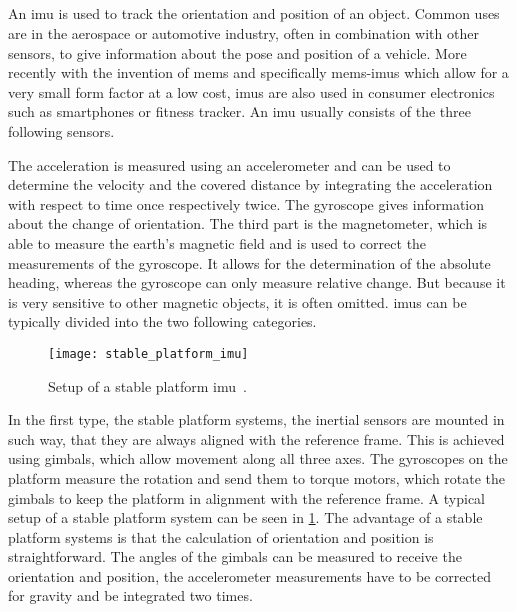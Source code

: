 \subsection{}
An \gls{imu} is used to track the orientation and position of an object.
Common uses are in the aerospace or automotive industry, often in combination with other sensors, to give information about the pose and position of a vehicle.
More recently with the invention of \gls{mems} and specifically \gls{mems}-\glspl{imu} which allow for a very small form factor at a low cost, \glspl{imu} are also used in consumer electronics such as smartphones or fitness tracker.
An \gls{imu} usually consists of the three following sensors.\par
The acceleration is measured using an accelerometer and can be used to determine the velocity and the covered distance by integrating the acceleration with respect to time once respectively twice.
The gyroscope gives information about the change of orientation.
The third part is the magnetometer, which is able to measure the earth's magnetic field and is used to correct the measurements of the gyroscope.
It allows for the determination of the absolute heading, whereas the gyroscope can only measure relative change. But because it is very sensitive to other magnetic objects, it is often omitted.
\glspl{imu} can be typically divided into the two following categories.\par
\begin{figure}[h]
    \centering
    \texttt{[image: stable\_platform\_imu]}
    \caption[Setup of a stable platform \acrshort{imu}]{Setup of a stable platform \acrshort{imu}~\cite{Woodman2007}.}
    \label{fig:stable_platform_imu}
\end{figure}
In the first type, the stable platform systems, the inertial sensors are mounted in such way, that they are always aligned with the reference frame.
This is achieved using gimbals, which allow movement along all three axes.
The gyroscopes on the platform measure the rotation and send them to torque motors, which rotate the gimbals to keep the platform in alignment with the reference frame.
A typical setup of a stable platform system can be seen in \cref{fig:stable_platform_imu}.
The advantage of a stable platform systems is that the calculation of orientation and position is straightforward.
The angles of the gimbals can be measured to receive the orientation and position, the accelerometer measurements have to be corrected for gravity and be integrated two times.
